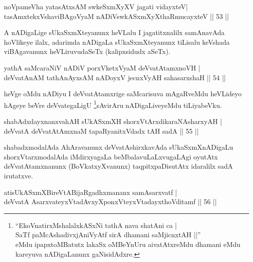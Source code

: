 \begin{shl}
noVpameVha yatasAtxsAM swkeSxmXyXV jagati vidayxteV|\\
tasAmxtekxVshaviBAgoV\s yaM nADiVswkASxmXyXthaRmucayxteV \hfill || 53 || 
\end{shl}

\begin{artha}
A nADigaLige sUkaSxmXteyanunx heVLalu I jagatitxnalilx samAnavAda hoVlikeye ilalx, adarimda nADigaLa sUkaSxmXteyanunx tiLisalu keVshada viBAgavanunx heVLiruvudaSeTx (kalipxsidudx aSeTx).
\end{artha}

\begin{shl}
yathA saMcaraNiV nADiV porxVketxVyaM deVvatAtamxnoVH |\\
deVvatAnAM tathA\s nAyxsAM nADoyxV jecnxVyAH sahasarxshaH \hfill || 54 || 
\end{shl}

\begin{artha}
heVge oMdu nADiyu I deVvatAtamxrige saMcarisuva mAgaRveMdu heVLideyo hAgeye beVre deVvategaLigU \footnote{``EkoVnatirxMshalalxkASxNi tathA nava shatAni ca | \\
SaTf paMcAshadivxjAniVyAtf sirA dhamani saMjicnxtAH ||''\\ eMdu ipapxtoMBatutx lakaSx oMBeYnUru aivatAtxreMdu dhamani eMdu kareyuva nADigaLanunx gaNisidAdxre.}sAvirAru nADigaLiveyeMdu tiLiyabeVku.
\end{artha}


\begin{shl}
shabAdxdayxnanxvahAH sUkASxmXH shorxVtArxdikaraNAsharxyAH |\\
deVvatA deVvatAtAmxnaM tapaRyanitxVdadx tAH sadA \hfill || 55 || 
\end{shl}

\begin{artha}
shabadxmodalAda AhAravanunx deVvatAshirxkavAda sUkaSxmXnADigaLu shorxVtarxmodalAda iMdirxyagaLa beMbalavuLaLxvugaLAgi oyutAtx deVvatAtamxnanunx (BoVkatxyXvanunx) taqpitxpaDisutAtx idaralilx sadA irutatxve.
\end{artha}

\begin{shl}
atisUkASxmXBireVtABijaRgadhxmananx samAsarxvatf |\\
deVvatA AsarxvateyxVtadAvxyXponxVteyxVtadayxthoVditamf \hfill || 56 || 
\end{shl}

